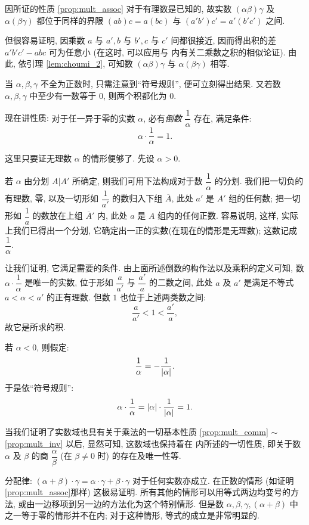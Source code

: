 因所证的性质 \ref{prop:mult_assoc} 对于有理数是已知的,
故实数 $(\alpha\beta)\gamma$ 及 $\alpha(\beta\gamma)$ 都位于同样的界限
$(ab)c = a(bc)$ 与 $(a'b')c' = a'(b'c')$ 之间.

但很容易证明, 因乘数 $a$ 与 $a', b$ 与 $b', c$ 与 $c'$ 间都很接近,
因而得出积的差 $a'b'c' - abc$ 可为任意小
(在这时, 可以应用与  内有关二乘数之积的相似论证).
由此, 依引理 \ref{lem:choumi_2}, 可知数 $(\alpha\beta)\gamma$ 与 $\alpha(\beta\gamma)$ 相等.

当 $\alpha, \beta, \gamma$ 不全为正数时, 只需注意到“符号规则”, 便可立刻得出结果.
又若数 $\alpha, \beta, \gamma$ 中至少有一数等于 $0$, 则两个积都化为 $0$.

现在讲性质:
{\kaishu
    \label{prop:mult_inv} 对于任一异于零的实数 $\alpha$, 必有\emph{倒数} $\dfrac{1}{\alpha}$ 存在, 满足条件:
    $$ \alpha \cdot \dfrac{1}{\alpha} = 1. $$
}

这里只要证无理数 $\alpha$ 的情形便够了. 先设 $\alpha > 0$.

若 $\alpha$ 由分划 $A|A'$ 所确定, 则我们可用下法构成对于数 $\dfrac{1}{\alpha}$ 的分划.
我们把一切负的有理数, 零, 以及一切形如 $\dfrac{1}{a'}$ 的数归入下组 $\overline{A}$, 此处 $a'$ 是 $A'$ 组的任何数;
把一切形如 $\dfrac{1}{a}$ 的数放在上组 $\overline{A}'$ 内, 此处 $a$ 是 $A$ 组内的任何正数.
容易说明, 这样, 实际上我们已得出一个分划,
它确定出一正的实数(在现在的情形是无理数); 这数记成 $\dfrac{1}{\alpha}$.

让我们证明, 它满足需要的条件.
由上面所述倒数的构作法以及乘积的定义可知,
数 $\alpha \cdot \dfrac{1}{\alpha}$ 是唯一的实数, 位于形如 $\dfrac{a}{a'}$ 与 $\dfrac{a'}{a}$ 的二数之间,
此处 $a$ 及 $a'$ 是满足不等式 $a < \alpha < a'$ 的正有理数.
但数 $1$ 也位于上述两类数之间:
$$ \dfrac{a}{a'} < 1 < \dfrac{a'}{a}, $$
故它是所求的积.

若 $\alpha < 0$, 则假定:
$$ \dfrac{1}{\alpha} = -\dfrac{1}{\left| \alpha \right|}. $$
于是依“符号规则”:
$$ \alpha \cdot \dfrac{1}{\alpha} = \left| \alpha \right| \cdot \dfrac{1}{\left| \alpha \right|} = 1. $$

当我们证明了实数域也具有关于乘法的一切基本性质 \ref{prop:mult_comm} $\sim$ \ref{prop:mult_inv} 以后,
显然可知, 这数域也保持着在  内所述的一切性质,
即关于数 $\alpha$ 及 $\beta$ 的商 $\dfrac{\alpha}{\beta}$ (在 $\beta \neq 0$ 时) 的存在及唯一性等.

{\kaishu 分配律}:
{\kaishu
    \label{prop:distributive} $(\alpha + \beta) \cdot \gamma = \alpha \cdot \gamma + \beta \cdot \gamma$
}
对于任何实数亦成立.
在正数的情形 (如证明 \ref{prop:mult_assoc}那样) 这极易证明.
所有其他的情形可以用等式两边均变号的方法, 或由一边移项到另一边的方法化为这个特别情形.
但是数 $\alpha, \beta, \gamma, (\alpha + \beta)$ 中之一等于零的情形并不在内; 对于这种情形, 等式的成立是非常明显的.

